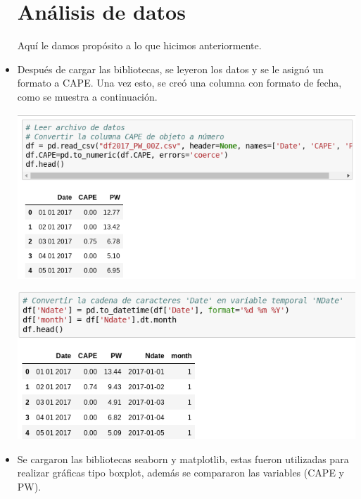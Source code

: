 \documentclass{article}
\begin{document}
\begin{doublespace}
\begin{itemize}
\section{Análisis de datos}
Aquí le damos propósito a lo que hicimos anteriormente.
\item Después de cargar las bibliotecas, se leyeron los datos y se le asignó un formato a CAPE. Una vez esto, se creó una columna con formato de fecha, como se muestra a continuación.

\begin{center}
\includegraphics[scale=0.5]{act55.png}
\end{center}
\begin{center}
\includegraphics[scale=0.5]{act56.png}
\end{center}

\item Se cargaron las bibliotecas seaborn y matplotlib, estas fueron utilizadas para realizar gráficas tipo boxplot, además se compararon las variables (CAPE y PW).


\end{itemize}
\end{doublespace}
\end{document}
